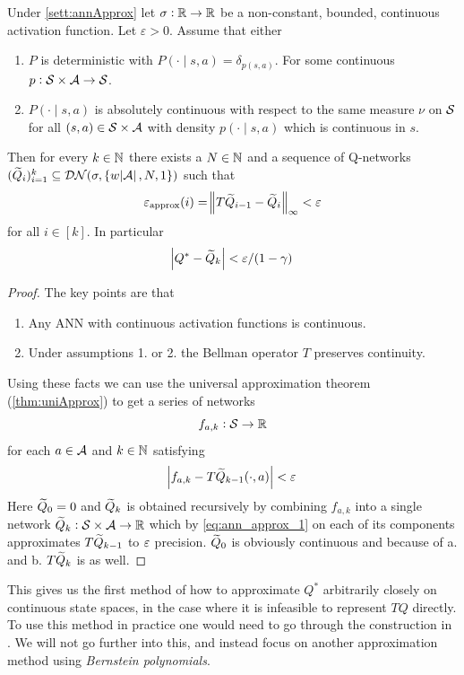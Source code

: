 \begin{prop}
  Under \cref{sett:annApprox} let
  $\sigma : \mathbb{R} \to \mathbb{R}$ be a non-constant, bounded, continuous
  activation function. Let $\varepsilon > 0$.
  Assume that either
  \begin{enumerate}
    \item $P$ is deterministic with $P(\cdot \mid s, a) = \delta_{p(s, a)}$.
      For some continuous $p: \mathcal{S} \times \mathcal{A} \to \mathcal{S}$.
    \item $P(\cdot \mid s, a)$ is absolutely continuous
      with respect to the same measure $\nu$ on $\mathcal{S}$ for all
      $(s, a) \in \mathcal{S} \times \mathcal{A}$ with density
      $p(\cdot \mid s, a)$ which is continuous in $s$.
  \end{enumerate}
  Then for every $k \in \mathbb{N}$ there exists a $N\in \mathbb{N}$ and a sequence of
  Q-networks $(\widetilde{Q}_i)_{i=1}^k \subseteq \mathcal{DN}(\sigma,
  \{w \abs{\mathcal{A}}, N, 1\})$ such that
  \[ \varepsilon_{\mathrm{approx}}(i) = \norm{T\widetilde{Q}_{i-1} - \widetilde{Q}_i}_\infty < \varepsilon \]
  for all $i \in [k]$.
  In particular
  \[ \abs{Q^* - \widetilde{Q}_k} < \varepsilon/(1 - \gamma) \]
\end{prop}
\begin{proof}
  The key points are that
  \begin{enumerate}[label=\alph*.]
    \item Any ANN with continuous activation functions is continuous.
    \item Under assumptions 1. or 2. the Bellman operator $T$ preserves
      continuity.
  \end{enumerate}
  Using these facts we can use the universal approximation theorem
  (\cref{thm:uniApprox}) to get a series of networks
  \[ f_{a, k} : \mathcal{S} \to \mathbb{R} \]
  for each $a \in \mathcal{A}$ and $k \in \mathbb{N}$ satisfying
  \begin{equation}
    \abs{f_{a, k} - T \widetilde{Q}_{k-1}(\cdot, a)} < \varepsilon
    \label{eq:ann_approx_1}
  \end{equation}
  Here $\widetilde{Q}_0 = 0$ and $\widetilde{Q}_k$ is obtained recursively by
  combining $f_{a, k}$ into a single network
  $\widetilde{Q}_k : \mathcal{S} \times \mathcal{A} \to \mathbb{R}$ which by
  \cref{eq:ann_approx_1} on each of its components
  approximates $T \widetilde{Q}_{k-1}$ to $\varepsilon$ precision.
  $\widetilde{Q}_0$ is obviously continuous and because of a. and b.
  $T \widetilde{Q}_k$ is as well.
\end{proof}

This gives us the first method of how to approximate
$Q^*$ arbitrarily closely on continuous state spaces, in the case
where it is infeasible to represent $TQ$ directly.
To use this method in practice one would need to go through the
construction in . We will not go further into this,
and instead focus on another approximation method using
\emph{Bernstein polynomials}.

